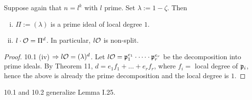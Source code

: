 \begin{Prop}
	Suppose again that $n = l^k$ with $l$ prime. Set $\lambda := 1 - \zeta$. Then
	\begin{enumerate}[(i)]
		\item $\Pi := (\lambda)$ is a prime ideal of local degree $1$.
		
		\item $l\cdot\mathcal{O} = \Pi^d$. In particular, $l\mathcal{O}$ is non-split.
	\end{enumerate}
\end{Prop}
\begin{proof}
	10.1 (iv) $\Rightarrow l\mathcal{O} = (\lambda)^d$. Let $l\mathcal{O} = \mathfrak{p}_1^{e_1} \cdot \dots \cdot \mathfrak{p}_r^{e_r}$ be the decomposition into prime ideals. By Theorem 11, $d = e_1f_1 + \dots + e_rf_r$, where $f_i = $ local degree of $\mathfrak{p}_i$, hence the above is already the prime decomposition and the local degree is $1$.
\end{proof}

\begin{Bem}
	10.1 and 10.2 generalize Lemma I.25.
\end{Bem}

